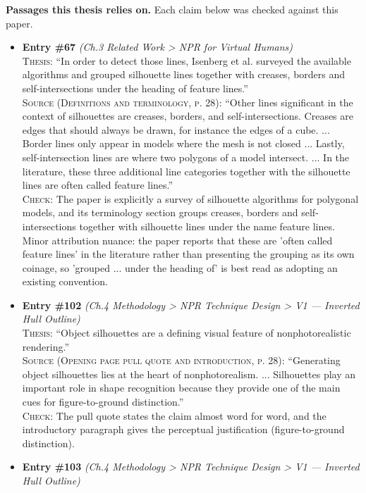 \documentclass[11pt, a4paper]{article}
\begin{document}
\textbf{Passages this thesis relies on.} Each claim below was checked against this paper.
\begin{itemize}[leftmargin=1.2em,itemsep=4pt]
\item \textbf{Entry \#67} \textit{(Ch.3 Related Work > NPR for Virtual Humans)}\\
\textsc{Thesis:} ``In order to detect those lines, Isenberg et al. surveyed the available algorithms and grouped silhouette lines together with creases, borders and self-intersections under the heading of feature lines.''\\
\textsc{Source (Definitions and terminology, p. 28):} ``Other lines significant in the context of silhouettes are creases, borders, and self-intersections. Creases are edges that should always be drawn, for instance the edges of a cube. ... Border lines only appear in models where the mesh is not closed ... Lastly, self-intersection lines are where two polygons of a model intersect. ... In the literature, these three additional line categories together with the silhouette lines are often called feature lines.''\\
\textsc{Check:} The paper is explicitly a survey of silhouette algorithms for polygonal models, and its terminology section groups creases, borders and self-intersections together with silhouette lines under the name feature lines. Minor attribution nuance: the paper reports that these are 'often called feature lines' in the literature rather than presenting the grouping as its own coinage, so 'grouped ... under the heading of' is best read as adopting an existing convention.
\item \textbf{Entry \#102} \textit{(Ch.4 Methodology > NPR Technique Design > V1 — Inverted Hull Outline)}\\
\textsc{Thesis:} ``Object silhouettes are a defining visual feature of nonphotorealistic rendering.''\\
\textsc{Source (Opening page pull quote and introduction, p. 28):} ``Generating object silhouettes lies at the heart of nonphotorealism. ... Silhouettes play an important role in shape recognition because they provide one of the main cues for figure-to-ground distinction.''\\
\textsc{Check:} The pull quote states the claim almost word for word, and the introductory paragraph gives the perceptual justification (figure-to-ground distinction).
\item \textbf{Entry \#103} \textit{(Ch.4 Methodology > NPR Technique Design > V1 — Inverted Hull Outline)}\\

\end{itemize}
\end{document}
